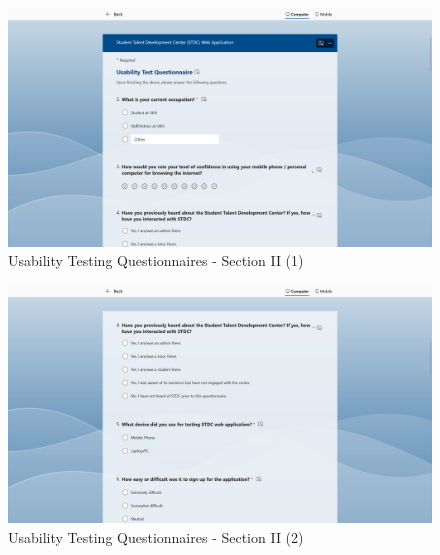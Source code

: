 \begin{justify}
\begin{figure}[H]
    \centerline{\includegraphics[width=150mm,scale=1]{figures/implementation_and_testing/testing/MUT/questions/Questions (3).png}}
    \caption{Usability Testing Questionnaires - Section II (1)}
    \label{Usability Testing Questionnaires - Section II (1)}
\end{figure}

\begin{figure}[H]
    \centerline{\includegraphics[width=150mm,scale=1]{figures/implementation_and_testing/testing/MUT/questions/Questions (4).png}}
    \caption{Usability Testing Questionnaires - Section II (2)}
    \label{Usability Testing Questionnaires - Section II (2)}
\end{figure}


\end{justify}
